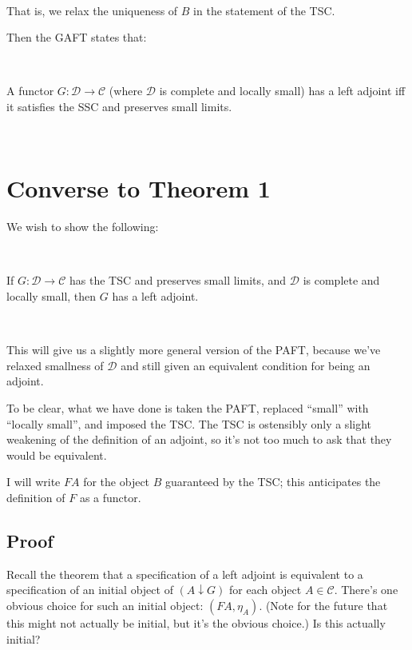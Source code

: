 \documentclass[11pt]{amsart}
\begin{document}
\

That is, we relax the uniqueness of $B$ in the statement of the TSC.

Then the GAFT states that:

\

\begin{thm} A functor $G: \mathcal{D} \to \mathcal{C}$ (where $\mathcal{D}$ is complete and locally small) has a left adjoint iff it satisfies the SSC and preserves small limits.
\end{thm}

\

\section{Converse to Theorem 1}

We wish to show the following:

\

\begin{thm} If $G: \mathcal{D} \to \mathcal{C}$ has the TSC and preserves small limits, and $\mathcal{D}$ is complete and locally small, then $G$ has a left adjoint.
\end{thm}

\

This will give us a slightly more general version of the PAFT, because we've relaxed smallness of $\mathcal{D}$ and still given an equivalent condition for being an adjoint.

To be clear, what we have done is taken the PAFT, replaced ``small'' with ``locally small'', and imposed the TSC.
The TSC is ostensibly only a slight weakening of the definition of an adjoint, so it's not too much to ask that they would be equivalent.

I will write $FA$ for the object $B$ guaranteed by the TSC; this anticipates the definition of $F$ as a functor.

\subsection{Proof} 
Recall the theorem that a specification of a left adjoint is equivalent to a specification of an initial object of $(A \downarrow G)$ for each object $A \in \mathcal{C}$.
There's one obvious choice for such an initial object: $(FA, \eta_A)$.
(Note for the future that this might not actually be initial, but it's the obvious choice.)
Is this actually initial?
\end{document}
